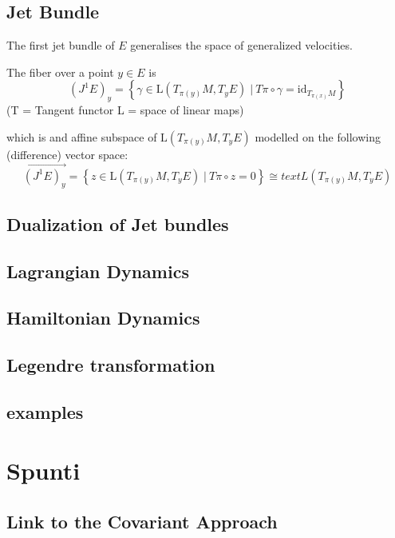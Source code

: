 \subsection{Jet Bundle}
The first jet bundle of $E$ generalises the space of generalized velocities.

The fiber over a point $y\in E$ is
\begin{displaymath}
	\left( J^1 E\right)_y = \left\lbrace \gamma \in \text{L}(T_{\pi(y)}M, T_y E) \; \vert \: T\pi \circ \gamma = \text{id}_{T_{\pi(x)} M} \right\rbrace
\end{displaymath}
(T = Tangent functor L = space of linear maps)

which is and affine subspace of $\text{L}(T_{\pi(y)}M, T_y E)$ modelled on the following (difference) vector space:
\begin{displaymath}
	\vec{\left( J^1 E\right)_y} = \left\lbrace z \in \text{L}(T_{\pi(y)}M, T_y E) \; \vert \: T\pi \circ z = 0 \right\rbrace
	\cong text{L}(T_{\pi(y)}M, T_y E)
\end{displaymath}

\subsection{Dualization of Jet bundles}

\subsection{Lagrangian Dynamics}

\subsection{Hamiltonian Dynamics}

\subsection{Legendre transformation}

\subsection{examples}

\section{Spunti}

\subsection{Link to the Covariant Approach}

